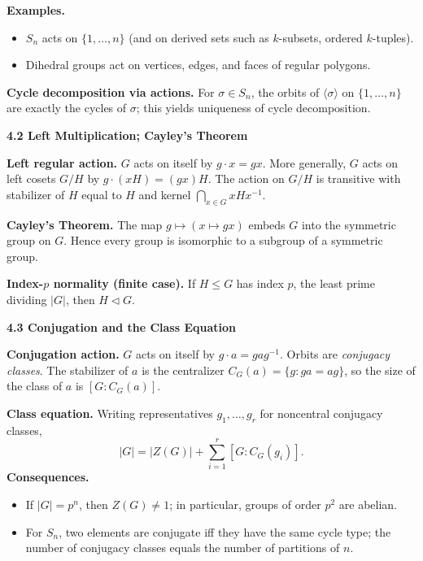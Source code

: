 \documentclass[11pt]{article}
\theoremstyle{definition}
\begin{document}
\medskip
\textbf{Examples.}
\begin{itemize}\itemsep3pt
\item $S_n$ acts on $\{1,\dots,n\}$ (and on derived sets such as $k$-subsets, ordered $k$-tuples).
\item Dihedral groups act on vertices, edges, and faces of regular polygons.
\end{itemize}

\medskip
\textbf{Cycle decomposition via actions.} For $\sigma\in S_n$, the orbits of $\langle\sigma\rangle$ on $\{1,\dots,n\}$ are exactly the cycles of $\sigma$; this yields uniqueness of cycle decomposition.

\newpage

\textbf{4.2 Left Multiplication; Cayley’s Theorem}

\newpage

\medskip
\textbf{Left regular action.} $G$ acts on itself by $g\cdot x=gx$. More generally, $G$ acts on left cosets $G/H$ by $g\cdot (xH)=(gx)H$. The action on $G/H$ is transitive with stabilizer of $H$ equal to $H$ and kernel $\bigcap_{x\in G}xHx^{-1}$.

\medskip
\textbf{Cayley’s Theorem.} The map $g\mapsto (x\mapsto gx)$ embeds $G$ into the symmetric group on $G$. Hence every group is isomorphic to a subgroup of a symmetric group.

\medskip
\textbf{Index-$p$ normality (finite case).} If $H\le G$ has index $p$, the least prime dividing $|G|$, then $H\lhd G$.

\newpage

\textbf{4.3 Conjugation and the Class Equation}

\newpage

\medskip
\textbf{Conjugation action.} $G$ acts on itself by $g\cdot a=gag^{-1}$. Orbits are \emph{conjugacy classes}. The stabilizer of $a$ is the centralizer $C_G(a)=\{g:ga=ag\}$, so the size of the class of $a$ is $[G:C_G(a)]$.

\medskip
\textbf{Class equation.} Writing representatives $g_1,\dots,g_r$ for noncentral conjugacy classes,
\[
|G|=|Z(G)|+\sum_{i=1}^r [G:C_G(g_i)].
\]
\textbf{Consequences.}
\begin{itemize}\itemsep3pt
\item If $|G|=p^n$, then $Z(G)\neq 1$; in particular, groups of order $p^2$ are abelian.
\item For $S_n$, two elements are conjugate iff they have the same cycle type; the number of conjugacy classes equals the number of partitions of $n$.
\end{itemize}
\end{document}
